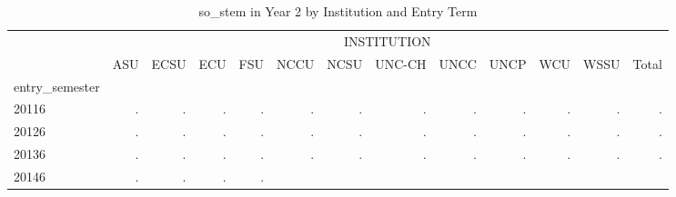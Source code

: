 \begin{table}[!h]
\caption{so\_stem in Year 2 by Institution and Entry Term}
\centering
\begin{tabular}{lllllllllllll}
\cline{1-13}
\multicolumn{1}{c}{} &
  \multicolumn{12}{|c}{INSTITUTION} \\
\multicolumn{1}{c}{} &
  \multicolumn{1}{|r}{ASU} &
  \multicolumn{1}{r}{ECSU} &
  \multicolumn{1}{r}{ECU} &
  \multicolumn{1}{r}{FSU} &
  \multicolumn{1}{r}{NCCU} &
  \multicolumn{1}{r}{NCSU} &
  \multicolumn{1}{r}{UNC-CH} &
  \multicolumn{1}{r}{UNCC} &
  \multicolumn{1}{r}{UNCP} &
  \multicolumn{1}{r}{WCU} &
  \multicolumn{1}{r}{WSSU} &
  \multicolumn{1}{r}{Total} \\
\cline{1-13}
\multicolumn{1}{l}{entry\_semester} &
  \multicolumn{1}{|r}{} &
  \multicolumn{1}{r}{} &
  \multicolumn{1}{r}{} &
  \multicolumn{1}{r}{} &
  \multicolumn{1}{r}{} &
  \multicolumn{1}{r}{} &
  \multicolumn{1}{r}{} &
  \multicolumn{1}{r}{} &
  \multicolumn{1}{r}{} &
  \multicolumn{1}{r}{} &
  \multicolumn{1}{r}{} &
  \multicolumn{1}{r}{} \\
\multicolumn{1}{l}{\hspace{1em}20116} &
  \multicolumn{1}{|r}{.} &
  \multicolumn{1}{r}{.} &
  \multicolumn{1}{r}{.} &
  \multicolumn{1}{r}{.} &
  \multicolumn{1}{r}{.} &
  \multicolumn{1}{r}{.} &
  \multicolumn{1}{r}{.} &
  \multicolumn{1}{r}{.} &
  \multicolumn{1}{r}{.} &
  \multicolumn{1}{r}{.} &
  \multicolumn{1}{r}{.} &
  \multicolumn{1}{r}{.} \\
\multicolumn{1}{l}{\hspace{1em}20126} &
  \multicolumn{1}{|r}{.} &
  \multicolumn{1}{r}{.} &
  \multicolumn{1}{r}{.} &
  \multicolumn{1}{r}{.} &
  \multicolumn{1}{r}{.} &
  \multicolumn{1}{r}{.} &
  \multicolumn{1}{r}{.} &
  \multicolumn{1}{r}{.} &
  \multicolumn{1}{r}{.} &
  \multicolumn{1}{r}{.} &
  \multicolumn{1}{r}{.} &
  \multicolumn{1}{r}{.} \\
\multicolumn{1}{l}{\hspace{1em}20136} &
  \multicolumn{1}{|r}{.} &
  \multicolumn{1}{r}{.} &
  \multicolumn{1}{r}{.} &
  \multicolumn{1}{r}{.} &
  \multicolumn{1}{r}{.} &
  \multicolumn{1}{r}{.} &
  \multicolumn{1}{r}{.} &
  \multicolumn{1}{r}{.} &
  \multicolumn{1}{r}{.} &
  \multicolumn{1}{r}{.} &
  \multicolumn{1}{r}{.} &
  \multicolumn{1}{r}{.} \\
\multicolumn{1}{l}{\hspace{1em}20146} &
  \multicolumn{1}{|r}{.} &
  \multicolumn{1}{r}{.} &
  \multicolumn{1}{r}{.} &
  \multicolumn{1}{r}{.} &

\end{tabular}
\end{table}
